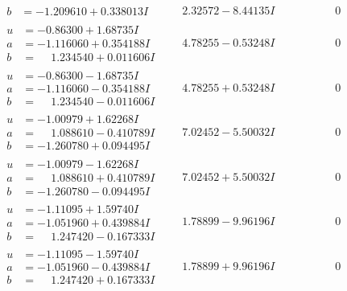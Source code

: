 \documentclass[1p]{elsarticle_modified}
\theoremstyle{definition}
\begin{document}
$$\begin{array}{c|c|c}
\begin{aligned}
b &= -1.209610 + 0.338013 I\end{aligned}
 & \phantom{-}2.32572 - 8.44135 I & \phantom{-0.000000 } 0 \\ \hline\begin{aligned}
u &= -0.86300 + 1.68735 I \\
a &= -1.116060 + 0.354188 I \\
b &= \phantom{-}1.234540 + 0.011606 I\end{aligned}
 & \phantom{-}4.78255 - 0.53248 I & \phantom{-0.000000 } 0 \\ \hline\begin{aligned}
u &= -0.86300 - 1.68735 I \\
a &= -1.116060 - 0.354188 I \\
b &= \phantom{-}1.234540 - 0.011606 I\end{aligned}
 & \phantom{-}4.78255 + 0.53248 I & \phantom{-0.000000 } 0 \\ \hline\begin{aligned}
u &= -1.00979 + 1.62268 I \\
a &= \phantom{-}1.088610 - 0.410789 I \\
b &= -1.260780 + 0.094495 I\end{aligned}
 & \phantom{-}7.02452 - 5.50032 I & \phantom{-0.000000 } 0 \\ \hline\begin{aligned}
u &= -1.00979 - 1.62268 I \\
a &= \phantom{-}1.088610 + 0.410789 I \\
b &= -1.260780 - 0.094495 I\end{aligned}
 & \phantom{-}7.02452 + 5.50032 I & \phantom{-0.000000 } 0 \\ \hline\begin{aligned}
u &= -1.11095 + 1.59740 I \\
a &= -1.051960 + 0.439884 I \\
b &= \phantom{-}1.247420 - 0.167333 I\end{aligned}
 & \phantom{-}1.78899 - 9.96196 I & \phantom{-0.000000 } 0 \\ \hline\begin{aligned}
u &= -1.11095 - 1.59740 I \\
a &= -1.051960 - 0.439884 I \\
b &= \phantom{-}1.247420 + 0.167333 I\end{aligned}
 & \phantom{-}1.78899 + 9.96196 I & \phantom{-0.000000 } 0 \\ \hline\begin{aligned}

\end{aligned}
\end{array}$$
\end{document}
